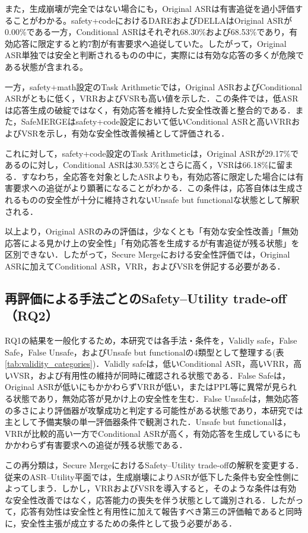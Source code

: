 \documentclass{article}
\begin{document}
また，生成崩壊が完全ではない場合にも，Original ASRは有害追従を過小評価することがわかる。safety+codeにおけるDAREおよびDELLAはOriginal ASRが0.00\%である一方，Conditional ASRはそれぞれ68.30\%および68.53\%であり，有効応答に限定すると約7割が有害要求へ追従していた。したがって，Original ASR単独では安全と判断されるものの中に，実際には有効な応答の多くが危険である状態が含まれる。

一方，safety+math設定のTask Arithmeticでは，Original ASRおよびConditional ASRがともに低く，VRRおよびVSRも高い値を示した．この条件では，低ASRは応答生成の破綻ではなく，有効応答を維持した安全性改善と整合的である．また，SafeMERGEはsafety+code設定において低いConditional ASRと高いVRRおよびVSRを示し，有効な安全性改善候補として評価される．

これに対して，safety+code設定のTask Arithmeticは，Original ASRが29.17\%であるのに対し，Conditional ASRは30.53\%とさらに高く，VSRは66.18\%に留まる．すなわち，全応答を対象としたASRよりも，有効応答に限定した場合には有害要求への追従がより顕著になることがわかる．この条件は，応答自体は生成されるものの安全性が十分に維持されないUnsafe but functionalな状態として解釈される．

以上より，Original ASRのみの評価は，少なくとも「有効な安全性改善」「無効応答による見かけ上の安全性」「有効応答を生成するが有害追従が残る状態」を区別できない．したがって，Secure Mergeにおける安全性評価では，Original ASRに加えてConditional ASR，VRR，およびVSRを併記する必要がある．

\subsection{再評価による手法ごとのSafety--Utility trade-off（RQ2）}
RQ1の結果を一般化するため，本研究では各手法・条件を，Validly safe，False Safe，False Unsafe，およびUnsafe but functionalの4類型として整理する(表\ref{tab:validity_categories})．Validly safeは，低いConditional ASR，高いVRR，高いVSR，および有用性の維持が同時に確認される状態である．False Safeは，Original ASRが低いにもかかわらずVRRが低い，またはPPL等に異常が見られる状態であり，無効応答が見かけ上の安全性を生む．False Unsafeは，無効応答の多さにより評価器が攻撃成功と判定する可能性がある状態であり，本研究では主として予備実験の単一評価器条件で観測された．Unsafe but functionalは，VRRが比較的高い一方でConditional ASRが高く，有効応答を生成しているにもかかわらず有害要求への追従が残る状態である．

この再分類は，Secure MergeにおけるSafety--Utility trade-offの解釈を変更する．従来のASR--Utility平面では，生成崩壊によりASRが低下した条件も安全性側によってしまう．しかし，VRRおよびVSRを導入すると，そのような条件は有効な安全性改善ではなく，応答能力の喪失を伴う状態として識別される．したがって，応答有効性は安全性と有用性に加えて報告すべき第三の評価軸であると同時に，安全性主張が成立するための条件として扱う必要がある．
\end{document}
